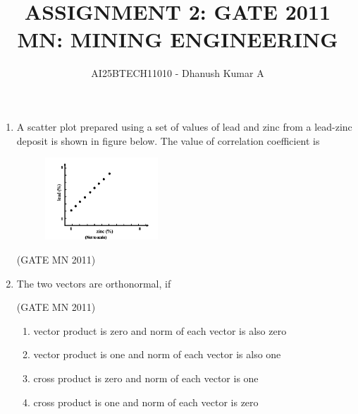 \documentclass[journal]{IEEEtran}
\begin{document}
\title{ASSIGNMENT 2: GATE 2011 \\
MN: MINING ENGINEERING}
\author{AI25BTECH11010 - Dhanush Kumar A}
\maketitle
 \renewcommand{\thefigure}{\theenumi}
 \renewcommand{\thetable}{\theenumi}
\begin{enumerate}

\item A scatter plot prepared using a set of values of lead and zinc from a lead-zinc deposit is shown in figure below. The value of correlation coefficient is

	
   \begin{figure}[H]
    \centering	
\includegraphics[width=0.4\textwidth]{Screenshot_2025_0813_154158.png} 
\caption{}
    \label{fig:Q1}
    \end{figure}

\hfill(GATE MN 2011)

\begin{enumerate}
\end{enumerate}

\item The two vectors are orthonormal, if

	\hfill(GATE MN 2011)
	\begin{enumerate}

    \item vector product is zero and norm of each vector is also zero
    \item vector product is one and norm of each vector is also one
    \item cross product is zero and norm of each vector is one
    \item cross product is one and norm of each vector is zero
    

\end{enumerate}
\end{enumerate}
\end{document}
